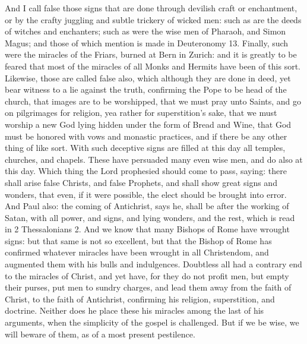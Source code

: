 And I call false those signs that are done through devilish craft or enchantment, or by the crafty juggling and subtle trickery of wicked men: such as are the deeds of witches and enchanters; such as were the wise men of Pharaoh, and Simon Magus; and those of which mention is made in Deuteronomy 13. Finally, such were the miracles of the Friars, burned at Bern in Zurich: and it is greatly to be feared that most of the miracles of all Monks and Hermits have been of this sort. Likewise, those are called false also, which although they are done in deed, yet bear witness to a lie against the truth, confirming the Pope to be head of the church, that images are to be worshipped, that we must pray unto Saints, and go on pilgrimages for religion, yea rather for superstition’s sake, that we must worship a new God lying hidden under the form of Bread and Wine, that God must be honored with vows and monastic practices, and if there be any other thing of like sort. With such deceptive signs are filled at this day all temples, churches, and chapels. These have persuaded many even wise men, and do also at this day. Which thing the Lord prophesied should come to pass, saying: there shall arise false Christs, and false Prophets, and shall show great signs and wonders, that even, if it were possible, the elect should be brought into error. And Paul also: the coming of Antichrist, says he, shall be after the working of Satan, with all power, and signs, and lying wonders, and the rest, which is read in 2 Thessalonians 2. And we know that many Bishops of Rome have wrought signs: but that same is not so excellent, but that the Bishop of Rome has confirmed whatever miracles have been wrought in all Christendom, and augmented them with his bulls and indulgences. Doubtless all had a contrary end to the miracles of Christ, and yet have, for they do not profit men, but empty their purses, put men to sundry charges, and lead them away from the faith of Christ, to the faith of Antichrist, confirming his religion, superstition, and doctrine. Neither does he place these his miracles among the last of his arguments, when the simplicity of the gospel is challenged. But if we be wise, we will beware of them, as of a most present pestilence.

